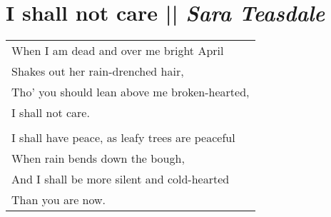 \section[I shall not care ]{I shall not care  || \emph{Sara Teasdale} \hspace*{\fill}  \thepage}
\hspace{0pt}
\vfill
\begin{center}
\begin{tabular}{l}
When I am dead and over me bright April\\
Shakes out her rain-drenched hair,\\
Tho' you should lean above me broken-hearted,\\
I shall not care.\\
\\I shall have peace, as leafy trees are peaceful\\
When rain bends down the bough,\\
And I shall be more silent and cold-hearted\\
Than you are now.
\end{tabular}
\end{center}
\vfill
\hspace{0pt}